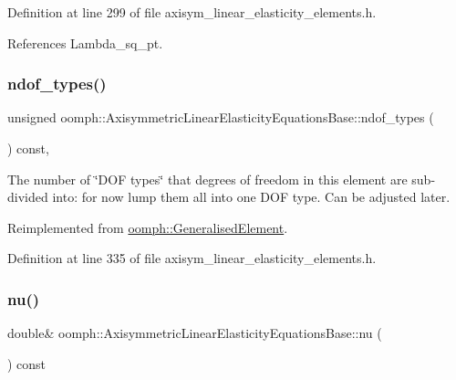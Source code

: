 Definition at line 299 of file axisym\+\_\+linear\+\_\+elasticity\+\_\+elements.\+h.



References Lambda\+\_\+sq\+\_\+pt.

\mbox{\label{classoomph_1_1AxisymmetricLinearElasticityEquationsBase_a46c5dca6d1bc3e471f71cb44bdc06284}} 
\subsubsection{\texorpdfstring{ndof\+\_\+types()}{ndof\_types()}}
{\footnotesize\ttfamily unsigned oomph\+::\+Axisymmetric\+Linear\+Elasticity\+Equations\+Base\+::ndof\+\_\+types (\begin{DoxyParamCaption}{ }\end{DoxyParamCaption}) const\hspace{0.3cm}{\ttfamily [inline]}, {\ttfamily [virtual]}}



The number of \char`\"{}\+D\+O\+F types\char`\"{} that degrees of freedom in this element are sub-\/divided into\+: for now lump them all into one D\+OF type. Can be adjusted later. 



Reimplemented from \hyperlink{classoomph_1_1GeneralisedElement_a0c6037a870597b35dcf1c780710b9a56}{oomph\+::\+Generalised\+Element}.



Definition at line 335 of file axisym\+\_\+linear\+\_\+elasticity\+\_\+elements.\+h.

\mbox{\label{classoomph_1_1AxisymmetricLinearElasticityEquationsBase_a73ee5401b8cfcd059cec299c0e0ff616}} 
\subsubsection{\texorpdfstring{nu()}{nu()}}
{\footnotesize\ttfamily double\& oomph\+::\+Axisymmetric\+Linear\+Elasticity\+Equations\+Base\+::nu (\begin{DoxyParamCaption}{ }\end{DoxyParamCaption}) const\hspace{0.3cm}{\ttfamily [inline]}}



